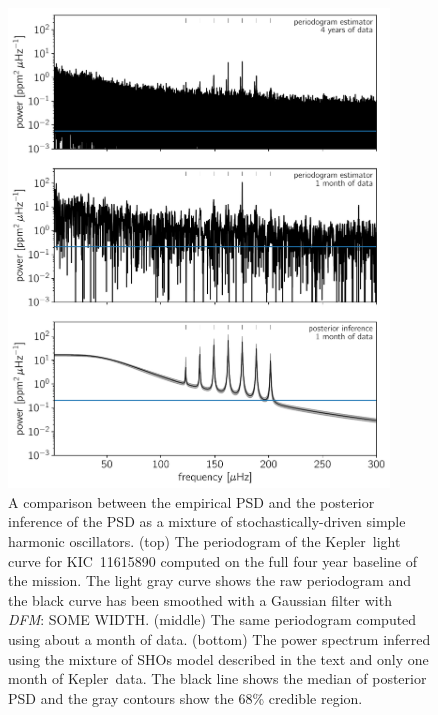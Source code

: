 \documentclass[manuscript, letterpaper]{aastex6}
\makeatletter
\let\origsubsection\subsection
\renewcommand\subsection{\@ifstar{\starsubsection}{\nostarsubsection}}
\newcommand\nostarsubsection[1]{\subsectionprelude\origsubsection{#1}}
\newcommand\starsubsection[1]{\subsectionprelude\origsubsection*{#1}}
\newcommand\subsectionprelude{\vspace{1em}}
\newcommand{\project}[1]{\textsf{#1}}
\newcommand{\kepler}{\project{Kepler}}
\newcommand{\figurelabel}[1]{\label{fig:#1}}
\newcommand{\todo}[3]{{\color{#2}\emph{#1}: #3}}
\newcommand{\dfmtodo}[1]{\todo{DFM}{red}{#1}}
\makeatother
\begin{document}
\begin{figure}[!htbp]
\begin{center}
\includegraphics[width=0.9\textwidth]{figures/astero-11615890-comparisons.pdf}
\caption{A comparison between the empirical PSD and the posterior inference of
the PSD as a mixture of stochastically-driven simple harmonic oscillators.
(top) The periodogram of the \kepler\ light curve for KIC~11615890 computed
    on the full four year baseline of the mission.
    The light gray curve shows the raw periodogram and the black curve has
    been smoothed with a Gaussian filter with \dfmtodo{SOME WIDTH}.
(middle) The same periodogram computed using about a month of data.
(bottom) The power spectrum inferred using the mixture of SHOs model described
    in the text and only one month of \kepler\ data.
    The black line shows the median of posterior PSD and the gray contours
    show the 68\% credible region.
    \figurelabel{astero}}
\end{center}
\end{figure}

\subsection{Stellar rotation}
\end{document}
